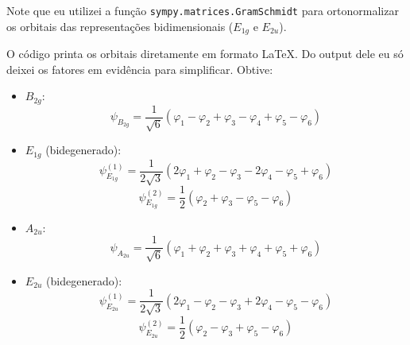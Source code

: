\documentclass[a4paper,10pt]{article}
\newcommand{\python}[1]{\texttt{#1}}
\begin{document}
Note que eu utilizei a função \python{sympy.matrices.GramSchmidt} para ortonormalizar os orbitais das representações bidimensionais ($E_{1g}$ e $E_{2u}$).

\n

O código printa os orbitais diretamente em formato \LaTeX. Do output dele eu só deixei os fatores em evidência para simplificar. Obtive:

\begin{itemize}
\item $B_{2g}$:
$$
\psi_{B_{2g}} =
\frac{1}{\sqrt{6}} (\varphi_{1} - \varphi_{2} + \varphi_{3} - \varphi_{4} + \varphi_{5} - \varphi_{6})
$$

\item $E_{1g}$ (bidegenerado):
$$
\psi_{E_{1g}}^{(1)} =
\frac{1}{2\sqrt{3}} (
2 \varphi_{1} + \varphi_{2} - \varphi_{3} - 2 \varphi_{4} - \varphi_{5} + \varphi_{6}
)
$$
$$
\psi_{E_{1g}}^{(2)} =
\frac{1}{2} (
\varphi_{2} + \varphi_{3} - \varphi_{5} - \varphi_{6}
)
$$

\item $A_{2u}$:
$$
\psi_{A_{2u}} =
\frac{1}{\sqrt{6}} (
\varphi_1 + \varphi_2 + \varphi_3 + \varphi_4 + \varphi_5 + \varphi_6
)
$$

\item $E_{2u}$ (bidegenerado):
$$
\psi_{E_{2u}}^{(1)} =
\frac{1}{2\sqrt{3}} (
2 \varphi_{1} - \varphi_{2} - \varphi_{3} + 2 \varphi_{4} - \varphi_{5} - \varphi_{6}
)
$$
$$
\psi_{E_{2u}}^{(2)} =
\frac{1}{2} (
\varphi_{2} - \varphi_{3} + \varphi_{5} - \varphi_{6}
)
$$
\end{itemize}
\end{document}
